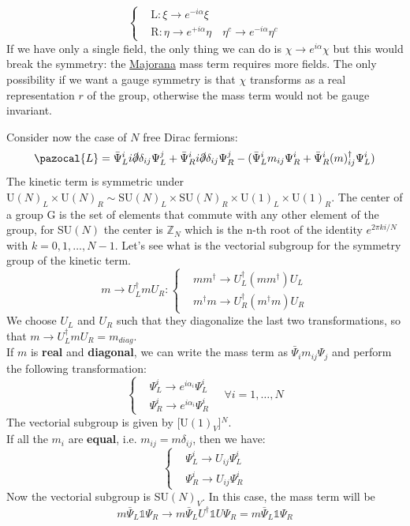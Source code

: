 \documentclass[../main.tex]{subfiles}
\begin{document}
\[
\left\{
\begin{aligned}
&\text{L:}\,\xi\to e^{-i\alpha}\xi\\
&\text{R:}\,\eta\to e^{+i\alpha}\eta \quad \eta^c\to e^{-i\alpha}\eta^c
\end{aligned}
\right.
\]
If we have only a single field, the only thing we can do is $\chi\to e^{i\alpha}\chi$ but this would break the symmetry: the \href{https://en.wikipedia.org/wiki/Ettore_Majorana}{Majorana} mass term requires more fields. The only possibility if we want a gauge symmetry is that $\chi$ transforms as a real representation $r$ of the group, otherwise the mass term would not be gauge invariant.
\begin{example}
Consider now the case of $N$ free Dirac fermions:
\[
\pazocal{L}=\bar{\Psi}_L^ii\slashed{\partial}\delta_{ij}\Psi_L^j+\bar{\Psi}_R^ii\slashed{\partial}\delta_{ij}\Psi_R^j-(\bar{\Psi}_L^im_{ij}\Psi_R^i+\bar{\Psi}_R^i(m)_{ij}^\dagger\Psi_L^i)
\]
The kinetic term is symmetric under\\
U$(N)_L\times$U$(N)_R\sim$SU$(N)_L\times$SU$(N)_R\times$U$(1)_L\times$U$(1)_R$. The center of a group G is the set of elements that commute with any other element of the group, for SU$(N)$ the center is $\mathbb{Z}_N$ which is the n-th root of the identity $e^{2\pi ki/N}$ with $k=0,1,\dots,N-1$. Let's see what is the vectorial subgroup for the symmetry group of the kinetic term.
\[
m\to U_L^\dagger mU_R:
\left\{
\begin{aligned}
&mm^\dagger\to U_L^\dagger(mm^\dagger)U_L\\
&m^\dagger m\to U_R^\dagger(m^\dagger m)U_R
\end{aligned}
\right.
\]
We choose $U_L$ and $U_R$ such that they diagonalize the last two transformations, so that $m\to U_L^\dagger mU_R=m_{diag}$.\\
If $m$ is \textbf{real} and \textbf{diagonal}, we can write the mass term as $\bar{\Psi}_im_{ij}\Psi_j$ and perform the following transformation:
\[
\left\{
\begin{aligned}
&\Psi_L^i\to e^{i\alpha_i}\Psi_L^i\\
&\Psi_R^i\to e^{i\alpha_i}\Psi_R^i
\end{aligned}
\quad\forall i=1,\dots,N
\right.
\]
The vectorial subgroup is given by [U$(1)_V$]$^N$.\\
If all the $m_i$ are \textbf{equal}, i.e. $m_{ij}=m\delta_{ij}$, then we have:
\[
\left\{
\begin{aligned}
&\Psi_L^i\to U_{ij}\Psi_L^i\\
&\Psi_R^i\to U_{ij}\Psi_R^i
\end{aligned}
\right.
\]
Now the vectorial subgroup is SU$(N)_V$. In this case, the mass term will be
\[
m\bar{\Psi}_L\mathbb{1}\Psi_R\to m\bar{\Psi}_LU^\dagger\mathbb{1}U\Psi_R=m\bar{\Psi}_L\mathbb{1}\Psi_R
\]
\end{example}
\end{document}
